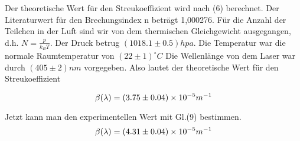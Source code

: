 Der theoretische Wert für den Streukoeffizient wird nach (6) berechnet. Der Literaturwert für den Brechungsindex n beträgt 1,000276. Für die Anzahl der Teilchen in der Luft sind wir von dem thermischen Gleichgewicht ausgegangen, d.h. $N = \frac{p}{k_B T}$. Der Druck betrug $(1018.1 \pm 0.5)hpa$. Die Temperatur war die normale Raumtemperatur von $(22 \pm 1)^{\circ}C$ Die Wellenlänge von dem Laser war durch $(405 \pm 2)nm$ vorgegeben. Also lautet der theoretische Wert für den Streukoeffizient

\begin{equation}
\notag
\beta(\lambda)= (3.75 \pm 0.04) \times 10^{-5} m^{-1}
\end{equation}

Jetzt kann man den experimentellen Wert mit Gl.(9) bestimmen.
\begin{equation}
\notag
\beta(\lambda)= (4.31 \pm 0.04) \times 10^{-5} m^{-1}
\end{equation} 




